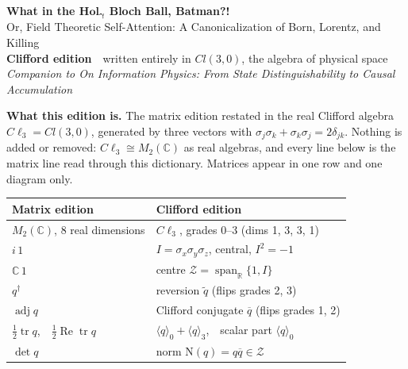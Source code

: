\documentclass[10pt]{article}
\newcommand{\Cp}{\mathbb{C}}
\newcommand{\Cl}{C\ell_3}
\newcommand{\rv}[1]{\widetilde{#1}}
\newcommand{\cj}[1]{\overline{#1}}
\newcommand{\gr}[2]{\langle #1\rangle_{#2}}
\newcommand{\N}{\mathrm N}
\newcommand{\Zc}{\mathcal Z}
\begin{document}
\color{black}
\vspace{0pt}
\begin{center}
{\Large\textbf{What in the $\mathbf{Hol}_{\boldsymbol\gamma}$ Bloch Ball, Batman?!}}\\[3pt]
{\large Or, Field Theoretic Self-Attention: A Canonicalization of Born, Lorentz, and Killing}\\[3pt]
{\large\textbf{Clifford edition}}\ \ {\normalsize written entirely in $Cl(3,0)$, the algebra of physical space}\\[3pt]
\textit{Companion to On Information Physics: From State Distinguishability to Causal Accumulation}
\end{center}
\vspace{1pt}
\begin{sheetbox}
\textbf{What this edition is.} The matrix edition restated in the real Clifford algebra $\Cl=Cl(3,0)$, generated by three vectors with $\sigma_j\sigma_k+\sigma_k\sigma_j=2\delta_{jk}$. Nothing is added or removed: $\Cl\cong M_2(\Cp)$ as real algebras, and every line below is the matrix line read through this dictionary. Matrices appear in one row and one diagram only.\par\vspace{3pt}
{\small\renewcommand{\arraystretch}{1.0}\setlength{\tabcolsep}{3pt}
\begin{minipage}[t]{0.5\linewidth}
\begin{tabular}[t]{@{}l l@{}}
\toprule
\textbf{Matrix edition} & \textbf{Clifford edition}\\
\midrule
$M_2(\Cp)$, 8 real dimensions & $\Cl$, grades 0--3 (dims 1, 3, 3, 1)\\
$i\,1$ & $I=\sigma_x\sigma_y\sigma_z$, central, $I^2=-1$\\
$\Cp\,1$ & centre $\Zc=\operatorname{span}_{\mathbb R}\{1,I\}$\\
$q^\dagger$ & reversion $\rv q$ (flips grades 2, 3)\\
$\operatorname{adj}q$ & Clifford conjugate $\cj q$ (flips grades 1, 2)\\
$\tfrac12\operatorname{tr}q$,\ \ $\tfrac12\operatorname{Re}\operatorname{tr}q$ & $\gr q0+\gr q3$,\ \ scalar part $\gr q0$\\
$\det q$ & norm $\N(q)=q\cj q\in\Zc$\\
\bottomrule
\end{tabular}
\end{minipage}\hfill
\begin{minipage}[t]{0.46\linewidth}

\end{minipage}}
\end{sheetbox}
\end{document}

